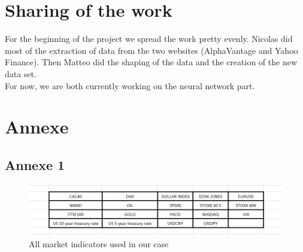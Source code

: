 \documentclass[]{article}
\begin{document}
\section{Sharing of the work}

\vskip 0.5cm
For the beginning of the project we spread the work pretty evenly.
Nicolas did most of the extraction of data from the two websites (AlphaVantage and Yahoo Finance). 
Then Matteo did the shaping of the data and the creation of the new data set.\\
For now, we are both currently working on the neural network part.

\section{Annexe}
\subsection{Annexe 1} 
\begin{figure}[hbt!]
	\center{}
	\includegraphics[scale=0.3]{image/marketSituation.png}
	\caption{All market indicators used in our case}
\end{figure}
\end{document}
